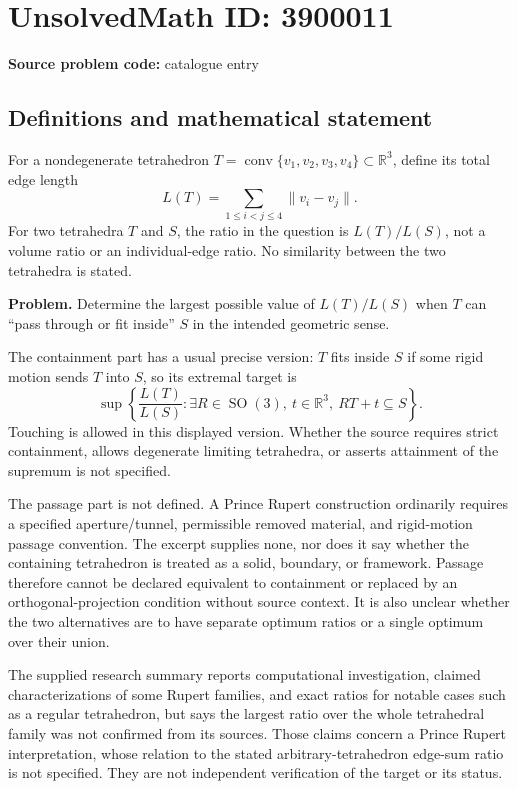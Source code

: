 \documentclass[11pt]{article}
\newcommand{\R}{\mathbb{R}}
\begin{document}
\section*{UnsolvedMath ID: 3900011}
\textbf{Source problem code:} catalogue entry
\subsection{Definitions and mathematical statement}
For a nondegenerate tetrahedron $T=\operatorname{conv}\{v_1,v_2,v_3,v_4\}\subset\R^3$, define its total edge length
\[
 L(T)=\sum_{1\leq i<j\leq4}\|v_i-v_j\|.
\]
For two tetrahedra $T$ and $S$, the ratio in the question is $L(T)/L(S)$, not a volume ratio or an individual-edge ratio. No similarity between the two tetrahedra is stated.

\textbf{Problem.} Determine the largest possible value of $L(T)/L(S)$ when $T$ can ``pass through or fit inside'' $S$ in the intended geometric sense.

The containment part has a usual precise version: $T$ fits inside $S$ if some rigid motion sends $T$ into $S$, so its extremal target is
\[
 \sup\left\{\frac{L(T)}{L(S)}:\exists R\in\operatorname{SO}(3),\ t\in\R^3,
                      \ RT+t\subseteq S\right\}.
\]
Touching is allowed in this displayed version. Whether the source requires strict containment, allows degenerate limiting tetrahedra, or asserts attainment of the supremum is not specified.

The passage part is not defined. A Prince Rupert construction ordinarily requires a specified aperture/tunnel, permissible removed material, and rigid-motion passage convention. The excerpt supplies none, nor does it say whether the containing tetrahedron is treated as a solid, boundary, or framework. Passage therefore cannot be declared equivalent to containment or replaced by an orthogonal-projection condition without source context. It is also unclear whether the two alternatives are to have separate optimum ratios or a single optimum over their union.

The supplied research summary reports computational investigation, claimed characterizations of some Rupert families, and exact ratios for notable cases such as a regular tetrahedron, but says the largest ratio over the whole tetrahedral family was not confirmed from its sources. Those claims concern a Prince Rupert interpretation, whose relation to the stated arbitrary-tetrahedron edge-sum ratio is not specified. They are not independent verification of the target or its status.
\end{document}
